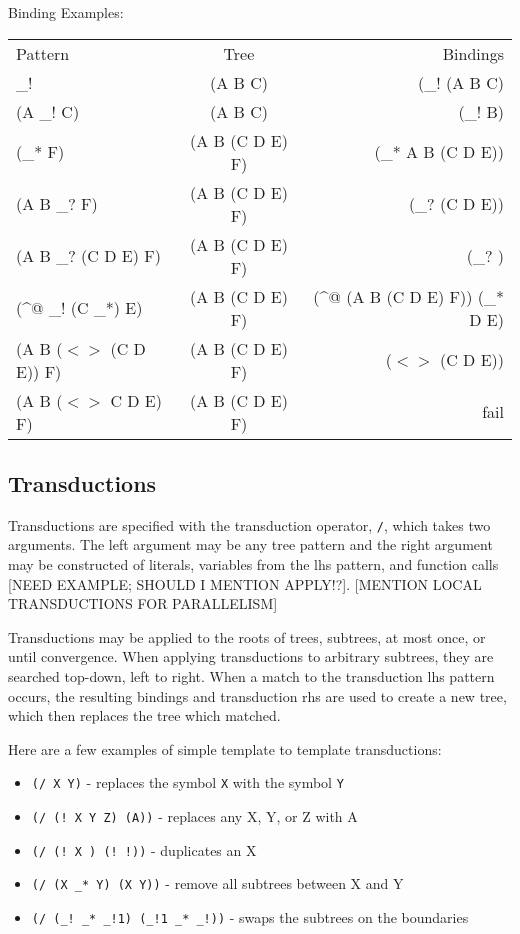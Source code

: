 \documentclass[11pt]{article}
\begin{document}
  Binding Examples:
  \begin{tabular} {l c r}
    Pattern  & Tree &   Bindings\\
    \_!   & (A B C) & (\_! (A B C)\\
    (A \_! C)     &        (A B C)   &              (\_! B)\\
    (\_* F)       &        (A B (C D E) F)   &      (\_*  A B (C D E))\\
    (A B \_? F)   &        (A B (C D E) F)   &      (\_? (C D E))\\
    (A B \_? (C D E) F)  & (A B (C D E) F)   &      (\_? )\\
    (\^{}@ \_! (C \_*) E)   & (A B (C D E) F)   &   (\^{}@ (A B (C D E) F))  (\_* D E)\\
    (A B ($<>$ (C D E)) F)  & (A B (C D E) F)   &   ($<>$ (C D E))\\
    (A B ($<>$ C D E) F)    & (A B (C D E) F)  &   fail\\
  \end{tabular}



\subsection*{Transductions}
Transductions are specified with the transduction operator, \texttt{/}, which takes two arguments.  The left argument may be any tree pattern and the right argument may be constructed of literals, variables from the lhs pattern, and function calls [NEED EXAMPLE; SHOULD I MENTION APPLY!?].  [MENTION LOCAL TRANSDUCTIONS FOR PARALLELISM]

Transductions may be applied to the roots of trees, subtrees, at most once, or until convergence.  When applying transductions to arbitrary subtrees, they are searched top-down, left to right.  When a match to the transduction lhs pattern occurs, the resulting bindings and transduction rhs are used to create a new tree, which then replaces the tree which matched. 

Here are a few examples of simple template to template transductions:
\begin {itemize}
\item  \texttt{(/ X Y)} - replaces the symbol \texttt{X} with the symbol \texttt{Y}
\item  \texttt{(/ (! X Y Z) (A))} - replaces any X, Y, or Z with A
\item  \texttt{(/ (! X ) (! !))} - duplicates an X
\item  \texttt{(/ (X \_* Y) (X Y))} - remove all subtrees between X and Y
\item  \texttt{(/ (\_! \_* \_!1) (\_!1 \_* \_!))} - swaps the subtrees on the boundaries
\end {itemize}
\end{document}
